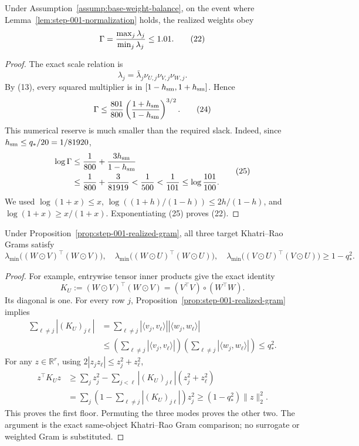 \begin{lemma}\label{lem:step-001-weight}
Under Assumption~\ref{assump:base-weight-balance}, on the event where
Lemma~\ref{lem:step-001-normalization} holds, the realized weights obey
\[
\Gamma={\max_j\lambda_j\over\min_j\lambda_j}\le1.01.
\tag{22}
\]

\begin{proof}
The exact scale relation is
\[
\lambda_j=\bar\lambda_j
\nu_{U,j}\nu_{V,j}\nu_{W,j}.
\tag{23}
\]
By (13), every squared multiplier is in
$[1-h_{\rm sm},1+h_{\rm sm}]$. Hence
\[
\Gamma\le {801\over800}
\left({1+h_{\rm sm}\over1-h_{\rm sm}}\right)^{3/2}.
\tag{24}
\]
This numerical reserve is much smaller than the required slack. Indeed,
since $h_{\rm sm}\le q_*/20=1/81920$,
\[
\begin{aligned}
\log\Gamma
&\le {1\over800}+{3h_{\rm sm}\over1-h_{\rm sm}}\\
&\le {1\over800}+{3\over81919}
<{1\over500}<{1\over101}
\le\log {101\over100}.
\end{aligned}
\tag{25}
\]
We used $\log(1+x)\le x$,
$\log((1+h)/(1-h))\le2h/(1-h)$, and
$\log(1+x)\ge x/(1+x)$. Exponentiating (25) proves (22). 


\end{proof}
\end{lemma}
\begin{proposition}\label{prop:step-001-khatri-rao}
Under Proposition~\ref{prop:step-001-realized-gram}, all three target
Khatri--Rao Grams satisfy
\[
\lambda_{\min}\bigl((W\odot V)^\top(W\odot V)\bigr),\quad
\lambda_{\min}\bigl((W\odot U)^\top(W\odot U)\bigr),\quad
\lambda_{\min}\bigl((V\odot U)^\top(V\odot U)\bigr)
\ge1-q_*^2.
\tag{26}
\]

\begin{proof}
For example, entrywise tensor inner products give the exact identity
\[
K_U:=(W\odot V)^\top(W\odot V)
=(V^\top V)\circ(W^\top W).
\tag{27}
\]
Its diagonal is one. For every row $j$,
Proposition~\ref{prop:step-001-realized-gram} implies
\[
\begin{aligned}
\sum_{\ell\ne j}|(K_U)_{j\ell}|
&=\sum_{\ell\ne j}
 |\langle v_j,v_\ell\rangle|
 |\langle w_j,w_\ell\rangle|\\
&\le
\left(\sum_{\ell\ne j}|\langle v_j,v_\ell\rangle|\right)
\left(\sum_{\ell\ne j}|\langle w_j,w_\ell\rangle|\right)
\le q_*^2.
\end{aligned}
\tag{28}
\]
For any $z\in\mathbb R^r$, using
$2|z_jz_\ell|\le z_j^2+z_\ell^2$,
\[
\begin{aligned}
z^\top K_Uz
&\ge\sum_jz_j^2
-\sum_{j<\ell}|(K_U)_{j\ell}|(z_j^2+z_\ell^2)\\
&=\sum_j\left(1-\sum_{\ell\ne j}|(K_U)_{j\ell}|\right)z_j^2
\ge(1-q_*^2)\|z\|_2^2.
\end{aligned}
\tag{29}
\]
This proves the first floor. Permuting the three modes proves the other two.
The argument is the exact same-object Khatri--Rao Gram comparison; no
surrogate or weighted Gram is substituted. 

\end{proof}
\end{proposition}
